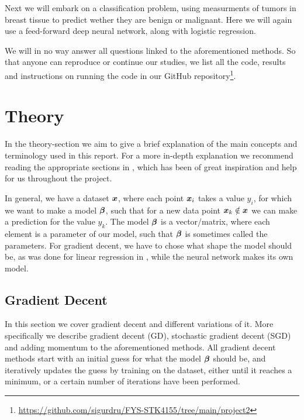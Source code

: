 \documentclass[12pt]{extarticle}
\begin{document}
Next we will embark on a classification problem, using measurments of tumors in breast tissue to predict wether they are benign or malignant. Here we will again use a feed-forward deep neural network, along with logistic regression.

We will in no way answer all questions linked to the aforementioned methods. So that anyone can reproduce or continue our studies, we list all the code, results and instructions on running the code in our GitHub repository\footnote{\href{https://github.com/sigurdru/FYS-STK4155/tree/main/project1}{https://github.com/sigurdru/FYS-STK4155/tree/main/project2}}.

\section{Theory}
In the theory-section we aim to give a brief explanation of the main concepts and terminology used in this report. For a more in-depth explanation we recommend reading the appropriate sections in \cite{2019}, which has been of great inspiration and help for us throughout the project.

In general, we have a dataset $\boldsymbol x$, where each point $\boldsymbol x_i$ takes a value $y_i$, for which we want to make a model $\boldsymbol{\beta}$, such that for a new data point $\boldsymbol x_k \notin \boldsymbol x$ we can make a prediction for the value $y_k$.  The model $\boldsymbol{\beta}$ is a vector/matrix, where each element is a parameter of our model, such that $\boldsymbol{\beta}$ is sometimes called the parameters. For gradient decent, we have to chose what shape the model should be, as was done for linear regression in \cite{project1}, while the neural network makes its own model.

\subsection{Gradient Decent}\label{sec:GD}
In this section we cover gradient decent and different variations of it. More specifically we describe gradient decent (GD), stochastic gradient decent (SGD) and adding momentum to the aforementioned methods. All gradient decent methods start with an initial guess for what the model $\boldsymbol{\beta}$ should be, and iteratively updates the guess by training on the dataset, either until it reaches a minimum, or a certain number of iterations have been performed.
\end{document}
